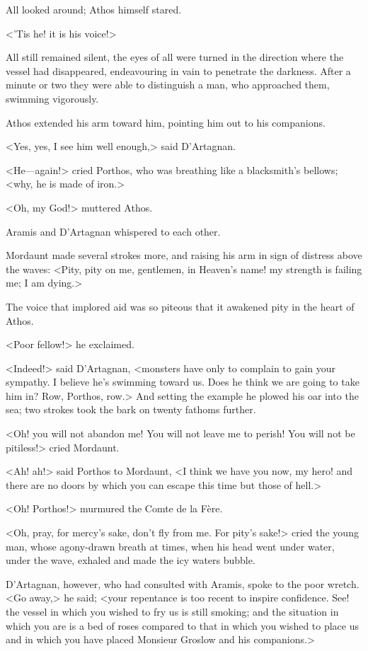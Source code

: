 All looked around; Athos himself stared.

<'Tis he! it is his voice!>

All still remained silent, the eyes of all were turned in the direction where the vessel had disappeared, endeavouring in vain to penetrate the darkness. After a minute or two they were able to distinguish a man, who approached them, swimming vigorously.

Athos extended his arm toward him, pointing him out to his companions.

<Yes, yes, I see him well enough,> said D'Artagnan.

<He—again!> cried Porthos, who was breathing like a blacksmith's bellows; <why, he is made of iron.>

<Oh, my God!> muttered Athos.

Aramis and D'Artagnan whispered to each other.

Mordaunt made several strokes more, and raising his arm in sign of distress above the waves: <Pity, pity on me, gentlemen, in Heaven's name! my strength is failing me; I am dying.>

The voice that implored aid was so piteous that it awakened pity in the heart of Athos.

<Poor fellow!> he exclaimed.

<Indeed!> said D'Artagnan, <monsters have only to complain to gain your sympathy. I believe he's swimming toward us. Does he think we are going to take him in? Row, Porthos, row.> And setting the example he plowed his oar into the sea; two strokes took the bark on twenty fathoms further.

<Oh! you will not abandon me! You will not leave me to perish! You will not be pitiless!> cried Mordaunt.

<Ah! ah!> said Porthos to Mordaunt, <I think we have you now, my hero! and there are no doors by which you can escape this time but those of hell.>

<Oh! Porthos!> murmured the Comte de la Fère.

<Oh, pray, for mercy's sake, don't fly from me. For pity's sake!> cried the young man, whose agony-drawn breath at times, when his head went under water, under the wave, exhaled and made the icy waters bubble.

D'Artagnan, however, who had consulted with Aramis, spoke to the poor wretch. <Go away,> he said; <your repentance is too recent to inspire confidence. See! the vessel in which you wished to fry us is still smoking; and the situation in which you are is a bed of roses compared to that in which you wished to place us and in which you have placed Monsieur Groslow and his companions.>

